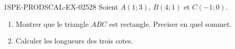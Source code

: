 \begin{exercice}{1SPE-PRODSCAL-EX-025}{2}{8}
Soient $A(1; 3)$, $B(4; 1)$ et $C(-1; 0)$.
\begin{enumerate}
  \item Montrer que le triangle $ABC$ est rectangle. Preciser en quel sommet.
  \item Calculer les longueurs des trois cotes.
\end{enumerate}
\end{exercice}
